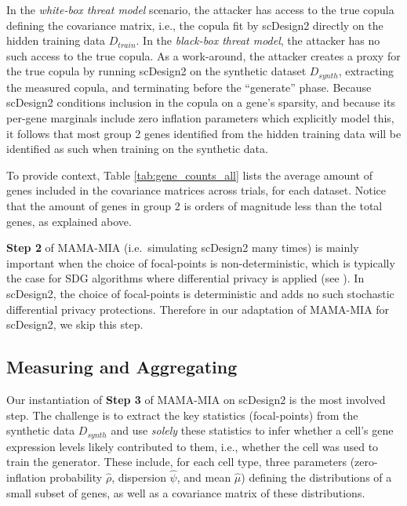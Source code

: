\documentclass[unnumsec,webpdf,contemporary,large]{oup-authoring-template}%
\theoremstyle{thmstyleone}%
\theoremstyle{thmstyletwo}%
\theoremstyle{thmstylethree}%
\begin{document}
In the \textit{white-box threat model} scenario, the attacker has access to the true copula defining the covariance matrix, i.e., the copula fit by scDesign2 directly on the hidden training data $D_{train}$. 
In the \textit{black-box threat model}, the attacker has no such access to the true copula. As a work-around, 
the attacker creates a proxy for the true copula  
by running scDesign2 on the synthetic dataset $D_{synth}$, extracting the measured copula, and terminating before the ``generate'' phase. Because scDesign2 conditions inclusion in the copula on a gene's sparsity, and because its per-gene marginals include zero inflation parameters which explicitly model this, it follows that most group 2 genes identified from the hidden training data will be identified as such when training on the synthetic data.

To provide context, Table \ref{tab:gene_counts_all} lists the average amount of genes included in the covariance matrices across trials, for each dataset. Notice that the amount of genes in group 2 is orders of magnitude less than the total genes, as explained above.

\textbf{Step 2} of MAMA-MIA (i.e.~simulating scDesign2 many times) is mainly important when the choice of focal-points is non-deterministic, which is typically the case for SDG algorithms where differential privacy \cite{dwork2014algorithmic} is applied (see \cite{golob_privacy_2025}). In scDesign2, the choice of focal-points is deterministic and adds no such stochastic differential privacy protections. Therefore in our adaptation of MAMA-MIA for scDesign2, we skip this step.

\subsection{Measuring and Aggregating}



Our instantiation of \textbf{Step 3} of MAMA-MIA on scDesign2 is the most involved step. 
The challenge is to extract the key statistics (focal-points) from the synthetic data $D_{synth}$ and use \textit{solely} these statistics to infer whether a cell's gene expression levels likely contributed to them, i.e., whether the cell was used to train the generator. These include, for each cell type, three parameters (zero-inflation probability $\hat\rho$, dispersion $\hat\psi$, and mean $\hat\mu$) defining the distributions of a small subset of genes, as well as a covariance matrix of these distributions. 
\end{document}
